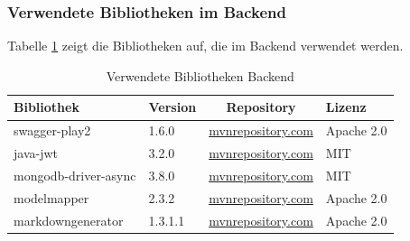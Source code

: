 \subsubsection{Verwendete Bibliotheken im Backend}
Tabelle \ref{tab:verwendete-libraries-play} zeigt die Bibliotheken auf, die im Backend verwendet werden. 
\begin{table}[h]
	\centering
	\begin{tabular}{| l | l | c | l |}
		\hline
		\textbf{Bibliothek} & \textbf{Version} & \textbf{Repository} & \textbf{Lizenz}\\
		\hline
		swagger-play2 & 1.6.0 & \href{https://mvnrepository.com/artifact/io.swagger/swagger-play2_2.12/1.6.0}{mvnrepository.com} & Apache 2.0 \\
		java-jwt & 3.2.0 & \href{https://mvnrepository.com/artifact/com.auth0/java-jwt/3.2.0}{mvnrepository.com} & MIT \\
		mongodb-driver-async & 3.8.0 & \href{https://mvnrepository.com/artifact/org.mongodb/mongodb-driver-async/3.8.0}{mvnrepository.com} & MIT \\
		modelmapper & 2.3.2 & \href{https://mvnrepository.com/artifact/org.modelmapper/modelmapper/2.3.2}{mvnrepository.com} & Apache 2.0 \\
		markdowngenerator & 1.3.1.1 & \href{https://mvnrepository.com/artifact/net.steppschuh.markdowngenerator/markdowngenerator}{mvnrepository.com} & Apache 2.0 \\
		\hline
	\end{tabular}
	\caption[Story-Points]{Verwendete Bibliotheken Backend}
	\label{tab:verwendete-libraries-play}
\end{table}

